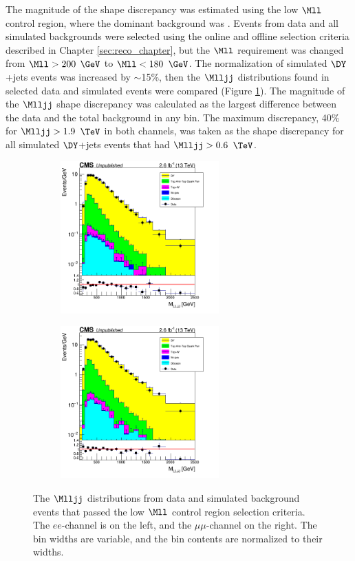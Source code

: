 The magnitude of the shape discrepancy was estimated using the low $\Mll$ control region, where the dominant background was \DY.  
Events from data and all simulated backgrounds were selected using the online and offline selection criteria described in Chapter 
\ref{sec:reco_chapter}, but the $\Mll$ requirement was changed from $\Mll > 200$ $\GeV$ to $\Mll < 180$ $\GeV$.  The normalization of 
simulated $\DY$+jets events was increased by $\sim$15\%, then the $\Mlljj$ distributions found 
in selected data and simulated events were compared (Figure \ref{fig:mlljjLowMllCR}).  The magnitude of the $\Mlljj$ shape discrepancy was 
calculated as the largest difference between the data and the total background in any bin.  The maximum discrepancy, 40\% for 
$\Mlljj > 1.9$ $\TeV$ in both channels, was taken as the shape discrepancy for all simulated $\DY$+jets events that had $\Mlljj > 0.6$ $\TeV$.

\begin{figure}
	\centering
	\begin{subfigure}[t]{2.4in}
		\centering
		\includegraphics[width=2.4in]{figures/Mlljj_eeChnl_lowMllCR.png}
	\end{subfigure}
	\thickspace
	\begin{subfigure}[t]{2.4in}
		\centering
		\includegraphics[width=2.4in]{figures/Mlljj_mumuChnl_lowMllCR.png}
	\end{subfigure}
	\caption{The $\Mlljj$ distributions from data and simulated background events that passed the low $\Mll$ control region selection 
		criteria.  The $ee$-channel is on the left, and the $\mu\mu$-channel on the right.  The bin widths are variable, and the bin 
	contents are normalized to their widths.}
	\label{fig:mlljjLowMllCR}
\end{figure}

